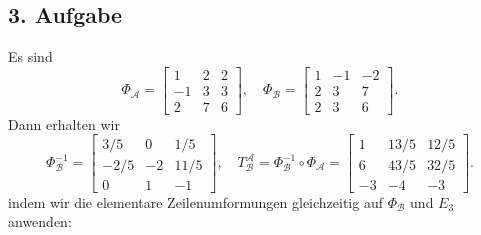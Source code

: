 \documentclass[fleqn,draft,a5paper]{article}
\theoremstyle{remark}
\begin{document}
\subsection{3. Aufgabe}
Es sind
\[\Phi_{\mathcal{A}}=
  \begin{bmatrix}
    1 & 2 & 2 \\ -1 & 3 & 3 \\ 2 & 7 & 6
  \end{bmatrix},
  \quad
  \Phi_{\mathcal{B}} =
  \begin{bmatrix}
    1 & -1 & -2 \\ 2 & 3 & 7 \\ 2 & 3 & 6
  \end{bmatrix}.
\]
Dann erhalten wir
\[\Phi_{\mathcal{B}}^{-1}=
  \begin{bmatrix}
    3/5 & 0 & 1/5 \\ -2/5 & -2 & 11/5 \\ 0 & 1 & -1
  \end{bmatrix}, \quad
  T^{\mathcal{A}}_{\mathcal{B}} = \Phi_{\mathcal{B}}^{-1} \circ \Phi_{\mathcal{A}} =
  \begin{bmatrix}
    1 & 13/5 & 12/5 \\ 6 & 43/5 & 32/5 \\ -3 & -4 & -3
  \end{bmatrix}.
\]
indem wir die  elementare Zeilenumformungen gleichzeitig auf \(\Phi_{\mathcal{B}}\)
und \(E_{3}\) anwenden:
\end{document}
